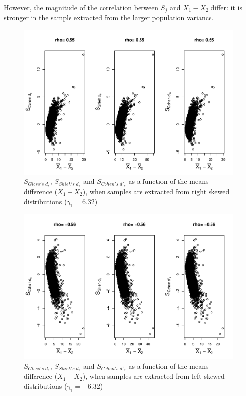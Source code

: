 \documentclass[
  man]{apa6}
\begin{document}
However, the magnitude of the correlation between \(S_j\) and \(\bar{X_1}-\bar{X_2}\) differ: it is stronger in the sample extracted from the larger population variance.

\begin{figure}
\centering
\includegraphics{Correlations-between-the-sample-means-difference-and-standardizers-of-all-estimators,-and-implications-on-biases-and-variances-of-all-estimators_files/figure-latex/pltStdzrHetbalRskew-1.pdf}
\caption{\label{fig:pltStdzrHetbalRskew}\(S_{Glass's \; d_s}\), \(S_{Shieh's \; d_s}\) and \(S_{Cohen's \; d'_s}\) as a function of the means difference (\(\bar{X_1}-\bar{X_2}\)), when samples are extracted from right skewed distributions (\(\gamma_1 = 6.32\))}
\end{figure}

\begin{figure}
\centering
\includegraphics{Correlations-between-the-sample-means-difference-and-standardizers-of-all-estimators,-and-implications-on-biases-and-variances-of-all-estimators_files/figure-latex/pltStdzrHetbalLskew-1.pdf}
\caption{\label{fig:pltStdzrHetbalLskew}\(S_{Glass's \; d_s}\), \(S_{Shieh's \; d_s}\) and \(S_{Cohen's \; d'_s}\) as a function of the means difference (\(\bar{X_1}-\bar{X_2}\)), when samples are extracted from left skewed distributions (\(\gamma_1 = -6.32\))}
\end{figure}
\end{document}
